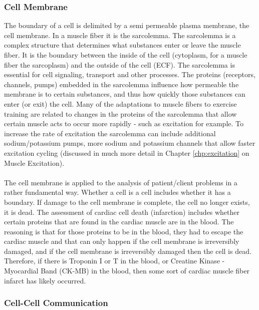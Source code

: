 \subsubsection{Cell Membrane}

The boundary of a cell is delimited by a semi permeable plasma membrane, the cell membrane. In a muscle fiber it is the sarcolemma. The sarcolemma is a complex structure that determines what substances enter or leave the muscle fiber. It is the boundary between the inside of the cell (cytoplasm, for a muscle fiber the sarcoplasm) and the outside of the cell (ECF). The sarcolemma is essential for cell signaling, transport and other processes. The proteins (receptors, channels, pumps) embedded in the sarcolemma influence how permeable the membrane is to certain substances, and thus how quickly those substances can enter (or exit) the cell. Many of the adaptations to muscle fibers to exercise training are related to changes in the proteins of the sarcolemma that allow certain muscle acts to occur more rapidly - such as excitation for example. To increase the rate of excitation the sarcolemma can include additional sodium/potassium pumps, more sodium and potassium channels that allow faster excitation cycling (discussed in much more detail in Chapter \ref{chp:excitation} on Muscle Excitation).

\paragraph{}
The cell membrane is applied to the analysis of patient/client problems in a rather fundamental way. Whether a cell is a cell includes whether it has a boundary. If damage to the cell membrane is complete, the cell no longer exists, it is dead. The assessment of cardiac cell death (infarction) includes whether certain proteins that are found in the cardiac muscle are in the blood. The reasoning is that for those proteins to be in the blood, they had to escape the cardiac muscle and that can only happen if the cell membrane is irreversibly damaged, and if the cell membrane is irreversibly damaged then the cell is dead. Therefore, if there is Troponin I or T in the blood, or Creatine Kinase - Myocardial Band (CK-MB) in the blood, then some sort of cardiac muscle fiber infarct has likely occurred.

\subsubsection{Cell-Cell Communication}

